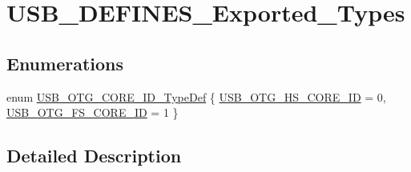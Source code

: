 \hypertarget{group___u_s_b___d_e_f_i_n_e_s___exported___types}{\section{U\-S\-B\-\_\-\-D\-E\-F\-I\-N\-E\-S\-\_\-\-Exported\-\_\-\-Types}
\label{group___u_s_b___d_e_f_i_n_e_s___exported___types}
}
\subsection*{Enumerations}
\begin{DoxyCompactItemize}
\item 
enum \hyperlink{group___u_s_b___d_e_f_i_n_e_s___exported___types_gab31b9dd0bc08bf6120424c20bda8eb7e}{U\-S\-B\-\_\-\-O\-T\-G\-\_\-\-C\-O\-R\-E\-\_\-\-I\-D\-\_\-\-Type\-Def} \{ \hyperlink{group___u_s_b___d_e_f_i_n_e_s___exported___types_ggab31b9dd0bc08bf6120424c20bda8eb7ea684783c61ecc71cca7046ad063e5d268}{U\-S\-B\-\_\-\-O\-T\-G\-\_\-\-H\-S\-\_\-\-C\-O\-R\-E\-\_\-\-I\-D} = 0, 
\hyperlink{group___u_s_b___d_e_f_i_n_e_s___exported___types_ggab31b9dd0bc08bf6120424c20bda8eb7ea8226051b835293c274bad9686af31a37}{U\-S\-B\-\_\-\-O\-T\-G\-\_\-\-F\-S\-\_\-\-C\-O\-R\-E\-\_\-\-I\-D} = 1
 \}
\end{DoxyCompactItemize}


\subsection{Detailed Description}


